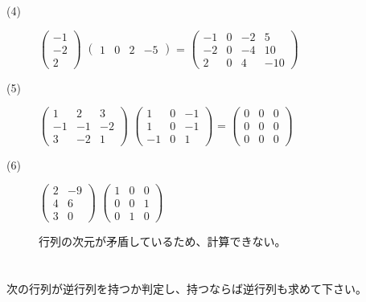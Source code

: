\documentclass{jsarticle}
\begin{document}
\begin{description}
		\item[(4)]
			$ \begin{pmatrix}
				-1 \\
				-2 \\
				2
			\end{pmatrix} $
			$ \begin{pmatrix}
				1 & 0 & 2 & -5
			\end{pmatrix} $
			=
			$ \begin{pmatrix}
				-1 & 0 & -2 & 5 \\
				-2 & 0 & -4 & 10 \\
				2 & 0 & 4 & -10
			\end{pmatrix} $

		\item[(5)]
			$ \begin{pmatrix}
				1 & 2 & 3 \\
				-1 & -1 & -2 \\
				3 & -2 & 1
			\end{pmatrix} $
			$ \begin{pmatrix}
				1 & 0 & -1 \\
				1 & 0 & -1 \\
				-1 & 0 & 1
			\end{pmatrix} $
			=
			$ \begin{pmatrix}
				0 & 0 & 0 \\
				0 & 0 & 0 \\
				0 & 0 & 0
			\end{pmatrix} $

		\item[(6)]
			$ \begin{pmatrix}
				2 & -9 \\
				4 & 6 \\
				3 & 0
			\end{pmatrix} $
			$ \begin{pmatrix}
				1 & 0 & 0 \\
				0 & 0 & 1 \\
				0 & 1 & 0
			\end{pmatrix} $

			行列の次元が矛盾しているため、計算できない。
	\end{description}

	\newpage

	\section{}
	次の行列が逆行列を持つか判定し、持つならば逆行列も求めて下さい。
\end{document}
